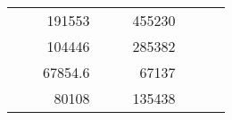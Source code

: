 \begin{table}[H]
\begin{tabular}{|ccrccrccc}
\multicolumn{1}{|c|}{\cellcolor[HTML]{FFFFC7}}                                & \multicolumn{1}{c|}{\cellcolor[HTML]{DDFDFF}}                      & \multicolumn{1}{r|}{\cellcolor[HTML]{DAE8FC}191553}    & \multicolumn{1}{c|}{\cellcolor[HTML]{FFFFC7}}                                & \multicolumn{1}{c|}{\cellcolor[HTML]{DDFDFF}}                       & \multicolumn{1}{r|}{\cellcolor[HTML]{DDFDFF}455230}    &                                                                              &                                                                    &                                                        \\ \cline{3-3} \cline{6-6}
\multicolumn{1}{|c|}{\cellcolor[HTML]{FFFFC7}}                                & \multicolumn{1}{c|}{\cellcolor[HTML]{DDFDFF}}                      & \multicolumn{1}{r|}{\cellcolor[HTML]{DDFDFF}104446}    & \multicolumn{1}{c|}{\cellcolor[HTML]{FFFFC7}}                                & \multicolumn{1}{c|}{\cellcolor[HTML]{DDFDFF}}                       & \multicolumn{1}{r|}{\cellcolor[HTML]{DAE8FC}285382}    &                                                                              &                                                                    &                                                        \\ \cline{3-3} \cline{6-6}
\multicolumn{1}{|c|}{\cellcolor[HTML]{FFFFC7}}                                & \multicolumn{1}{c|}{\cellcolor[HTML]{DDFDFF}}                      & \multicolumn{1}{r|}{\cellcolor[HTML]{DAE8FC}67854.6}   & \multicolumn{1}{c|}{\cellcolor[HTML]{FFFFC7}}                                & \multicolumn{1}{c|}{\cellcolor[HTML]{DDFDFF}}                       & \multicolumn{1}{r|}{\cellcolor[HTML]{DDFDFF}67137}     &                                                                              &                                                                    &                                                        \\ \cline{3-3} \cline{6-6}
\multicolumn{1}{|c|}{\cellcolor[HTML]{FFFFC7}}                                & \multicolumn{1}{c|}{\cellcolor[HTML]{DDFDFF}}                      & \multicolumn{1}{r|}{\cellcolor[HTML]{DDFDFF}80108}     & \multicolumn{1}{c|}{\cellcolor[HTML]{FFFFC7}}                                & \multicolumn{1}{c|}{\cellcolor[HTML]{DDFDFF}}                       & \multicolumn{1}{r|}{\cellcolor[HTML]{DAE8FC}135438}    &                                                                              &                                                                    &                                                        \\ \cline{3-3} \cline{6-6}

\end{tabular}
\end{table}
